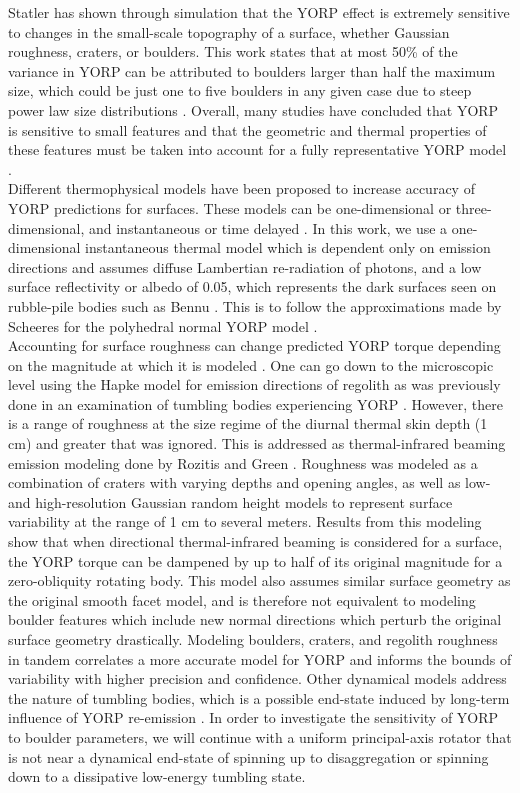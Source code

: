 Statler has shown through simulation that the YORP effect is extremely sensitive to changes in the small-scale topography of a surface, whether Gaussian roughness, craters, or boulders. This work states that at most 50\% of the variance in YORP can be attributed to boulders larger than half the maximum size, which could be just one to five boulders in any given case due to steep power law size distributions \citep{Statler2009}.  Overall, many studies have concluded that YORP is sensitive to small features and that the geometric and thermal properties of these features must be taken into account for a fully representative YORP model \citep{Breiter2009}. 
\\ \indent Different thermophysical models have been proposed to increase accuracy of YORP predictions for surfaces. These models can be one-dimensional or three-dimensional, and instantaneous or time delayed \citep{Rozitis2012}. In this work, we use a one-dimensional instantaneous thermal model which is dependent only on emission directions and assumes diffuse Lambertian re-radiation of photons, and a low surface reflectivity or albedo of 0.05, which represents the dark surfaces seen on rubble-pile bodies such as Bennu \citep{Golish2021}. This is to follow the approximations made by Scheeres for the polyhedral normal YORP model \citep{Scheeres2007}.
\\ \indent Accounting for surface roughness can change predicted YORP torque depending on the magnitude at which it is modeled \citep{Davidsson2014} \citep{Davidsson2015}. One can go down to the microscopic level using the Hapke model for emission directions of regolith as was previously done in an examination of tumbling bodies experiencing YORP \citep{Breiter2011a}.  However, there is a range of roughness at the size regime of the diurnal thermal skin depth (1 cm) and greater that was ignored. This is addressed as thermal-infrared beaming emission modeling done by Rozitis and Green \citep{Rozitis2011}. Roughness was modeled as a combination of craters with varying depths and opening angles, as well as low- and high-resolution Gaussian random height models to represent surface variability at the range of 1 cm to several meters. Results from this modeling show that when directional thermal-infrared beaming is considered for a surface, the YORP torque can be dampened by up to half of its original magnitude for a zero-obliquity rotating body. This model also assumes similar surface geometry as the original smooth facet model, and is therefore not equivalent to modeling boulder features which include new normal directions which perturb the original surface geometry drastically. Modeling boulders, craters, and regolith roughness in tandem correlates a more accurate model for YORP and informs the bounds of variability with higher precision and confidence.  Other dynamical models address the nature of tumbling bodies, which is a possible end-state induced by long-term influence of YORP re-emission \citep{Cicalo2010} \citep{Breiter2015}.  In order to investigate the sensitivity of YORP to boulder parameters, we will continue with a uniform principal-axis rotator that is not near a dynamical end-state of spinning up to disaggregation or spinning down to a dissipative low-energy tumbling state. 
